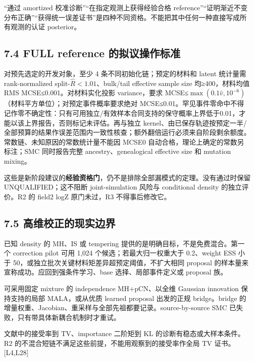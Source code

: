\documentclass[
  11pt,
  a4paper,
]{article}
\begin{document}
``通过 amortized 校准诊断''``在指定观测上获得经验合格
reference''``证明渐近不变分布正确''``获得统一误差证书''是四种不同资格。不能把其中任何一种直接写成所有观测的认证
posterior。

\hypertarget{full-reference-ux7684ux62dfux8baeux64cdux4f5cux6807ux51c6}{%
\subsection{7.4 FULL reference
的拟议操作标准}\label{full-reference-ux7684ux62dfux8baeux64cdux4f5cux6807ux51c6}}

对预先选定的开发对象，至少 4 条不同初始化链；预定的材料和 latent
统计量需 rank-normalized split-\(\widehat R<1.01\)、bulk/tail effective
sample size 均≥400，材料均值 RMS MCSE≤0.001。对材料实化投影
variance，要求
MCSE≤\(\max(0.1\widehat v,10^{-6})\)（材料平方单位）；对预定事件概率要求绝对
MCSE≤0.01。罕见事件零命中不得记作零不确定性：只有可用独立/有效样本合同支持的保守概率上界低于0.01，才能以该上界报告，否则标记未评估。再与独立
kernel、由已保存轨迹按预定一半/全部预算的结果作误差范围内一致性核查；额外翻倍运行必须来自阶段剩余额度。常数链、未知原因的常数统计量不能因
MCSE0 自动合格，理论上确定的常数另标注；SMC 同时报告完整
ancestry、genealogical effective size 和 mutation mixing。

这些是新阶段建议的\textbf{经验资格门}，仍不是排除全部漏模式的定理。没有通过时保留
UNQUALIFIED；这不阻断 joint-simulation 风险与 conditional density
的独立评价。R2 的 field2 logZ 原门未过，R3 不得事后修改它。

\hypertarget{ux9ad8ux7ef4ux6821ux6b63ux7684ux73b0ux5b9eux8fb9ux754c}{%
\subsection{7.5
高维校正的现实边界}\label{ux9ad8ux7ef4ux6821ux6b63ux7684ux73b0ux5b9eux8fb9ux754c}}

已知 density 的 MH、IS 或 tempering
提供的是明确目标，不是免费混合。第一个 correction pilot 可用 1,024
个候选；若最大归一权重大于 0.2、weight ESS 小于
50，或独立批次关键材料矩差异超预定阈值，不扩大相同 proposal
的样本量来宣称成功。应回到强条件学习、base 选择、局部事件定义或 proposal
族。

可采用固定 mixture 的 independence MH+pCN、以全维 Gaussian innovation
保持支持的局部 MALA，或从优质 learned proposal 出发的正规 bridge。bridge
的增量权重、Jacobian、重采样与全部先祖都要记录。source-by-source SMC
已失败，只有带具体新耦合机制时才重试。

文献中的接受率到 TV、importance 二阶矩到 KL 的诊断有稳态或大样本条件。R2
的不混合短链不满足这些前提，不能用观察到的接受率作全局 TV
证书。{[}L4,L28{]}
\end{document}
